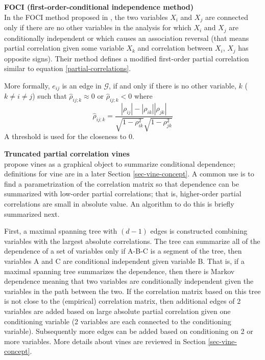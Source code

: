 \documentclass[a4paper]{article}
\def\g{{\mathcal{G}}}
\def\hatrho{{\hat{\rho}}}
\def\lij {L_{\{i,j\}}}
\begin{document}
\vspace{0.2cm}

\noindent\textbf{FOCI (first-order-conditional independence method) }\\
In the FOCI method proposed in \cite{magwene2004estimating}, the two variables $X_i$ and $X_j$ are connected only if there are no other variables in the analysis for which $X_i$ and $X_j$ are conditionally independent or which causes an association reversal (that means partial correlation given some variable $X_k$ and
correlation between $X_i$, $X_j$ has opposite signs). Their method defines a modified first-order partial correlation similar to equation \eqref{partial-correlations}. 

More formally, $e_{ij}$ is an edge in $\g$, if and only if there is no other variable, $k$ ($k\neq i\neq j$) such that $\hatrho_{ij;k}\approx 0$ or $\hatrho_{ij;k}<0$ where
\begin{equation*}
    \hatrho_{ij;k}=\frac{|\rho_{ij}|-|\rho_{ik}||\rho_{jk}|}{\sqrt{1-\rho_{ik}^2}\sqrt{1-\rho_{jk}^2}}
\end{equation*}
A threshold is used for the closeness to 0.

\vspace{0.2cm}

\noindent\textbf{Truncated partial correlation vines}\\
\cite{bedford2002vines} propose vines as a graphical object to summarize conditional dependence; definitions for vine are in a later Section \ref{sec-vine-concept}.
A common use is to find a parametrization
of the correlation matrix so that dependence can be summarized with low-order partial correlations;
that is, higher-order partial correlations are small in absolute value. An algorithm to do
this is briefly summarized next.


First, a maximal spanning tree with $(d-1)$ edges is constructed combining variables with the
largest absolute correlations. The tree can summarize all of the dependence of a set of variables only if A-B-C is a segment of the tree, then variables A and C are conditional independent given variable B. That is, if a maximal spanning tree summarizes the dependence, then there is Markov dependence meaning that two variables are conditionally independent given the variables in the path between the two. If the correlation matrix based on this tree is not close to the (empirical) correlation matrix, then additional edges of 2 variables are added based on large absolute partial correlation given one conditioning variable (2 variables are each connected to the conditioning variable).
Subsequently more edges can be added based on conditioning on 2 or more variables. More details about vines are reviewed in Section \ref{sec-vine-concept}.
\end{document}
